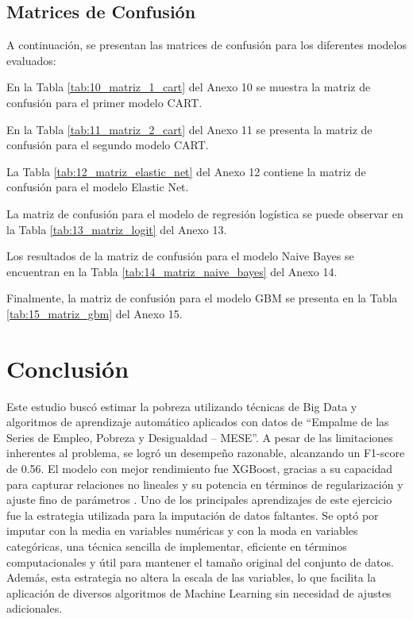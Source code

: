 \documentclass[12pt,a4paper,onecolumn]{article}
\begin{document}
\subsection{Matrices de Confusión}

A continuación, se presentan las matrices de confusión para los diferentes modelos evaluados:

En la Tabla \ref{tab:10_matriz_1_cart} del Anexo 10 se muestra la matriz de confusión para el primer modelo CART.

En la Tabla \ref{tab:11_matriz_2_cart} del Anexo 11 se presenta la matriz de confusión para el segundo modelo CART.

La Tabla \ref{tab:12_matriz_elastic_net} del Anexo 12 contiene la matriz de confusión para el modelo Elastic Net.

La matriz de confusión para el modelo de regresión logística se puede observar en la Tabla \ref{tab:13_matriz_logit} del Anexo 13.

Los resultados de la matriz de confusión para el modelo Naive Bayes se encuentran en la Tabla \ref{tab:14_matriz_naive_bayes} del Anexo 14.

Finalmente, la matriz de confusión para el modelo GBM se presenta en la Tabla \ref{tab:15_matriz_gbm} del Anexo 15.

\section{Conclusión}

Este estudio buscó estimar la pobreza utilizando técnicas de Big Data y algoritmos de aprendizaje automático aplicados con datos de “Empalme de las Series de Empleo, Pobreza y Desigualdad – MESE”. A pesar de las limitaciones inherentes al problema, se logró un desempeño razonable, alcanzando un F1-score de 0.56. El modelo con mejor rendimiento fue XGBoost, gracias a su capacidad para capturar relaciones no lineales y su potencia en términos de regularización y ajuste fino de parámetros \cite{huang2025unveiling}.
Uno de los principales aprendizajes de este ejercicio fue la estrategia utilizada para la imputación de datos faltantes. Se optó por imputar con la media en variables numéricas y con la moda en variables categóricas, una técnica sencilla de implementar, eficiente en términos computacionales y útil para mantener el tamaño original del conjunto de datos. Además, esta estrategia no altera la escala de las variables, lo que facilita la aplicación de diversos algoritmos de Machine Learning sin necesidad de ajustes adicionales.
\end{document}
